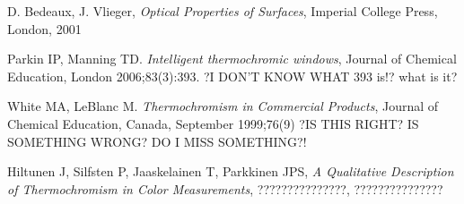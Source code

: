\clearpage
\begin{thebibliography}{9}

      D. Bedeaux, J. Vlieger, 
      \emph{Optical Properties of Surfaces}, 
      Imperial College Press, 
      London, 2001

      Parkin IP, Manning TD.
      \emph{Intelligent thermochromic windows}, 
      Journal of Chemical Education,
      London 2006;83(3):393. ?I DON'T KNOW WHAT 393 is!? what is it?


      White MA, LeBlanc M.
      \emph{Thermochromism in Commercial Products}, 
      Journal of Chemical Education,
      Canada, September 1999;76(9) ?IS THIS RIGHT? IS SOMETHING WRONG? DO I MISS SOMETHING?!

      Hiltunen J, Silfsten P, Jaaskelainen T, Parkkinen JPS,
      \emph{A Qualitative Description of Thermochromism in Color Measurements}, 
      ???????????????,
      ???????????????
      

\end{thebibliography}

